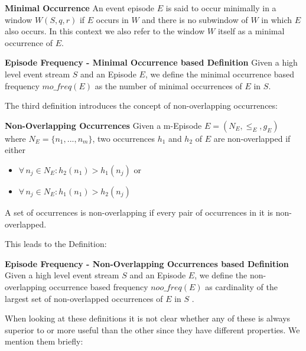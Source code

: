 \begin{mydef}
\textbf{Minimal Occurrence} An event episode $E$ is said to occur minimally in a window $W(S,q,r)$ if $E$ occurs in $W$ and there is no subwindow of $W$ in which $E$ also occurs. In this context we also refer to the window $W$ itself as a minimal occurrence of $E$.
\end{mydef}

\begin{mydef}
\textbf{Episode Frequency - Minimal Occurrence based Definition} Given a high level event stream $S$ and an Episode $E$, we define the minimal occurrence based frequency $mo\_freq(E)$ as the number of minimal occurrences of $E$ in $S$.
\end{mydef}

The third definition introduces the concept of non-overlapping occurrences:

\begin{mydef}
\textbf{Non-Overlapping Occurrences} Given a m-Episode $E = (N_E,{\leq}_{E},g_E)$ where $N_E = \{n_1,...,n_m\}$, two occurrences $h_1$ and $h_2$ of $E$ are non-overlapped if either 
\begin{itemize}
	\item $\forall \, n_j \in N_E : h_2(n_1)>h_1(n_j)$ or 
	\item $\forall \, n_j \in N_E : h_1(n_1)>h_2(n_j)$
\end{itemize}
A set of occurrences is non-overlapping if every pair of occurrences in it is non-overlapped.
\end{mydef}

This leads to the Definition:

\begin{mydef}
\textbf{Episode Frequency - Non-Overlapping Occurrences based Definition} Given a high level event stream $S$ and an Episode $E$, we define the non-overlapping occurrence based frequency $noo\_freq(E)$ as cardinality of the largest set of non-overlapped occurrences of $E$ in $S$ \cite{laxman2007fast}.
\end{mydef}



When looking at these definitions it is not clear whether any of these is always superior to or more useful than the other since they have different properties. We mention them briefly:

